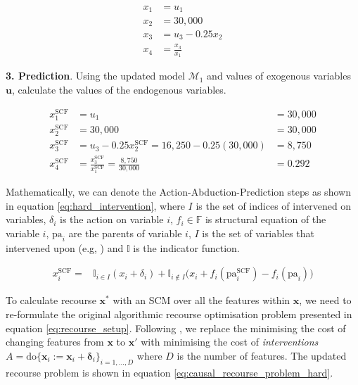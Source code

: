 \begin{align}
	x_1 & = u_1 \\ \nonumber
	x_2 & = 30,000 \\ \nonumber
	x_3 & = u_3 - 0.25x_2 \\ \nonumber %
	x_4 & = \frac{x_3}{x_1} %
\end{align}

\textbf{3. Prediction}. Using the updated model $\mathcal{M}_1$ and values of exogenous variables $\mathbf{u}$, calculate the values of the endogenous variables.

\begin{align}
	x^{\text{SCF}}_1 & = u_1 &  = 30,000 \\ \nonumber
	x^{\text{SCF}}_2 & = 30,000 & = 30,000 \\ \nonumber
	x^{\text{SCF}}_3 & = u_3 - 0.25x^{\text{SCF}}_2 = 16,250 - 0.25(30,000) & = 8,750 \\ \nonumber
	x^{\text{SCF}}_4 & = \frac{x^{\text{SCF}}_3}{x^{\text{SCF}}_1} = \frac{8,750}{30,000} & = 0.292
\end{align}

Mathematically, we can denote the Action-Abduction-Prediction steps as shown in equation \ref{eq:hard_intervention}, where $I$ is the set of indices of intervened on variables, $\delta_i$ is the action on variable $i$, $f_i \in \mathbb{F}$ is structural equation of the variable $i$,  $\text{pa}_i$ are the parents of variable $i$, $I$ is the set of variables that intervened upon (e.g, ) and $\mathbb{I}$ is the indicator function.

\begin{align} \label{eq:hard_intervention}
	x^{\text{SCF}}_i = & \mathbb{I}_{i \in I} (x_i + \delta_i) + \mathbb{I}_{i \notin I} \bigg(x_i + f_i(\text{pa}^{\text{SCF}}_i) - f_i(\text{pa}_i)\bigg)
\end{align}


To calculate recourse $\mathbf{x}^*$ with an SCM over all the features within $\mathbf{x}$, we need to re-formulate the original algorithmic recourse optimisation problem presented in equation \ref{eq:recourse_setup}. Following \textcite{karimiAlgorithmicRecourseCounterfactual2021}, we replace the minimising the cost of changing features from $\mathbf{x}$ to $\mathbf{x}'$ with minimising the cost of \textit{interventions} $A = \text{do} \{\mathbf{x}_i:=\mathbf{x}_i + \boldsymbol{\delta}_i\}_{i=1, \ldots, D}$ where $D$ is the number of features. The updated recourse problem is shown in equation \ref{eq:causal_recourse_problem_hard}.

